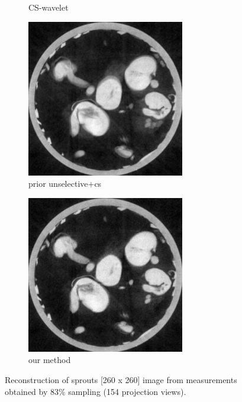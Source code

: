 \documentclass{article}
\begin{document}
\begin{figure}[h]
\begin{subfigure}[b]{0.3\linewidth}
        \caption{CS-wavelet}
     \end{subfigure}
\quad
    \begin{subfigure}[b]{0.3\linewidth}
        \includegraphics[width=\textwidth]{../images/supplementary/2D_sprouts/154_angles/1/plain_pca.png}
        \caption{prior unselective+cs}
     \end{subfigure}
\quad
    \begin{subfigure}[b]{0.3\linewidth}
        \includegraphics[width=\textwidth]{../images/supplementary/2D_sprouts/154_angles/1/weighted_pca5.png}
        \caption{our method}
     \end{subfigure}
     \caption{Reconstruction of sprouts [260 x 260] image from measurements obtained by $83\%$ sampling (154 projection views).} 
\label{fig:joint}
\end{figure}
\end{document}
